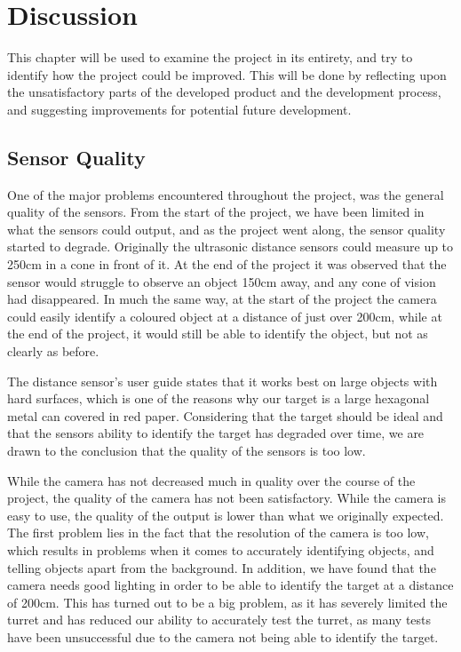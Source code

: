 \chapter{Discussion}\label{projDiscus}
This chapter will be used to examine the project in its entirety, and try to
identify how the project could be improved. This will be done by reflecting upon the
unsatisfactory parts of the developed product and the development process, and
suggesting improvements for potential future development.

\section{Sensor Quality}\label{DSQ}
One of the major problems encountered throughout the project, was the
general quality of the sensors. From the start of the project, we have been
limited in what the sensors could output, and as the project went along, the
sensor quality started to degrade. Originally the ultrasonic distance sensors
could measure up to 250cm in a cone in front of it. At the end
of the project it was observed that the sensor would struggle to observe an
object 150cm away, and any cone of vision had disappeared. In much the same
way, at the start of the project the camera could easily identify a coloured
object at a distance of just over 200cm, while at the end of the project, it
would still be able to identify the object, but not as clearly as before.\nl

The distance sensor's user guide states that it works best on large objects with
hard surfaces, which is one of the reasons why our target is a large hexagonal
metal can covered in red paper. 
Considering that the target should be ideal and that the sensors ability to
identify the target has degraded over time, we are drawn to the conclusion that
the quality of the sensors is too low. \nl

While the camera has not decreased much in quality over the course of the
project, the quality of the camera has not been satisfactory.
While the camera is easy to use, the quality of the output is lower than what
we originally expected. The first problem lies in the fact that the resolution
of the camera is too low, which results in problems when it comes to accurately
identifying objects, and telling objects apart from the background. In
addition, we have found that the camera needs good lighting in order to
be able to identify the target at a distance of 200cm. This has turned out to be
a big problem, as it has severely limited the turret and has reduced our ability
to accurately test the turret, as many tests have been unsuccessful due to the
camera not being able to identify the target.\nl

